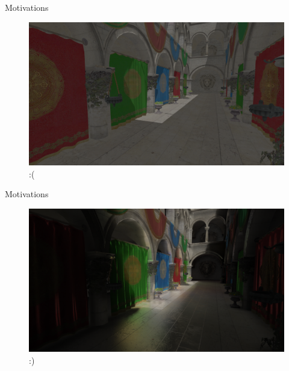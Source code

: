 \documentclass[10pt]{beamer}
\begin{document}
\begin{frame}{Motivations}
      \begin{figure}
        \includegraphics[width=\textwidth]{gi_off.png}
        :(
      \end{figure}
    \end{frame} \begin{frame}{Motivations}
      \begin{figure}
        \includegraphics[width=\textwidth]{gi_on.png}
        :)
      \end{figure}
\end{frame}
\end{document}
